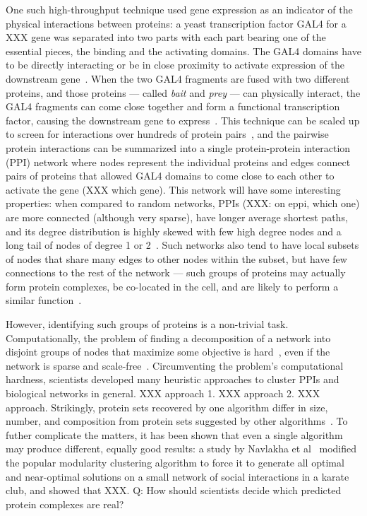 One such high-throughput technique used gene expression as an indicator of the physical interactions between proteins: a yeast transcription factor GAL4 for a XXX gene was separated into two parts with each part bearing one of the essential pieces, the binding and the activating domains. The GAL4 domains have to be directly interacting or be in close proximity to activate expression of the downstream gene~\cite{XXX}. When the two GAL4 fragments are fused with two different proteins, and those proteins --- called \textit{bait} and \textit{prey} --- can physically interact, the GAL4 fragments can come close together and form a functional transcription factor, causing the downstream gene to express~\cite{XXX}. This technique can be scaled up to screen for interactions over hundreds of protein pairs~\cite{Ito 2001}, and the pairwise protein interactions can be summarized into a single protein-protein interaction (PPI) network where nodes represent the individual proteins and edges connect pairs of proteins that allowed GAL4 domains to come close to each other to activate the gene (XXX which gene). This network will have some interesting properties: when compared to random networks, PPIs (XXX: on eppi, which one) are more connected (although very sparse), have longer average shortest paths, and its degree distribution is highly skewed with few high degree nodes and a long tail of nodes of degree 1 or 2~\cite{Zhu et al 2007}. Such networks also tend to have local subsets of nodes that share many edges to other nodes within the subset, but have few connections to the rest of the network --- such groups of proteins may actually form protein complexes, be co-located in the cell, and are likely to perform a similar function~\cite{ProteinComplexesPPI}.



However, identifying such groups of proteins is a non-trivial task. 
Computationally, the problem of finding a decomposition of a network into disjoint groups of nodes that maximize some objective is hard~\cite{ModularityNPhard}, even if the network is sparse and scale-free~\cite{XXX}.
Circumventing the problem's computational hardness, scientists developed many heuristic approaches to cluster PPIs and biological networks in general. XXX approach 1. XXX approach 2. XXX approach. Strikingly, protein sets recovered by one algorithm differ in size, number, and composition from protein sets suggested by other algorithms~\cite{blah}. To futher complicate the matters, it has been shown that even a single algorithm may produce different, equally good results: a study by Navlakha et al~\cite{SaketModularity} modified the popular modularity clustering algorithm to force it to generate all optimal and near-optimal solutions on a small network of social interactions in a karate club, and showed that XXX. Q: How should scientists decide which predicted protein complexes are real?


